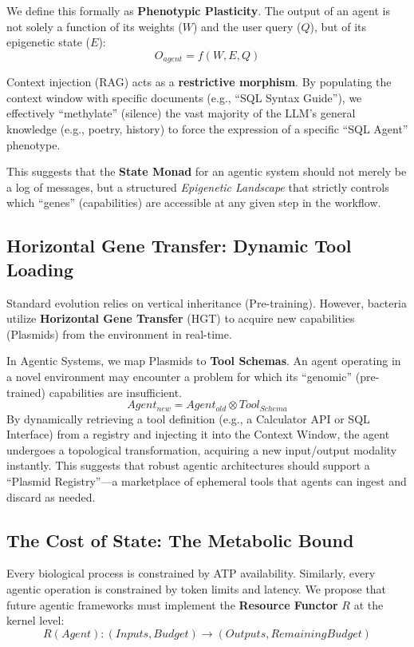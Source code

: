 \documentclass[11pt, a4paper]{article}
\begin{document}
We define this formally as \textbf{Phenotypic Plasticity}. The output of an agent is not solely a function of its weights ($W$) and the user query ($Q$), but of its epigenetic state ($E$):
\begin{equation}
    O_{agent} = f(W, E, Q)
\end{equation}

Context injection (RAG) acts as a \textbf{restrictive morphism}. By populating the context window with specific documents (e.g., ``SQL Syntax Guide''), we effectively ``methylate'' (silence) the vast majority of the LLM's general knowledge (e.g., poetry, history) to force the expression of a specific ``SQL Agent'' phenotype.

This suggests that the \textbf{State Monad} for an agentic system should not merely be a log of messages, but a structured \textit{Epigenetic Landscape} that strictly controls which ``genes'' (capabilities) are accessible at any given step in the workflow.

\subsection{Horizontal Gene Transfer: Dynamic Tool Loading}
Standard evolution relies on vertical inheritance (Pre-training). However, bacteria utilize \textbf{Horizontal Gene Transfer} (HGT) to acquire new capabilities (Plasmids) from the environment in real-time. 

In Agentic Systems, we map Plasmids to \textbf{Tool Schemas}. An agent operating in a novel environment may encounter a problem for which its ``genomic'' (pre-trained) capabilities are insufficient. 
\begin{equation}
    Agent_{new} = Agent_{old} \otimes Tool_{Schema}
\end{equation}
By dynamically retrieving a tool definition (e.g., a Calculator API or SQL Interface) from a registry and injecting it into the Context Window, the agent undergoes a topological transformation, acquiring a new input/output modality instantly. This suggests that robust agentic architectures should support a ``Plasmid Registry''---a marketplace of ephemeral tools that agents can ingest and discard as needed.

\subsection{The Cost of State: The Metabolic Bound}
Every biological process is constrained by ATP availability. Similarly, every agentic operation is constrained by token limits and latency. We propose that future agentic frameworks must implement the \textbf{Resource Functor} $R$ at the kernel level:
\begin{equation}
    R(Agent): (Inputs, Budget) \to (Outputs, RemainingBudget)
\end{equation}
\end{document}

